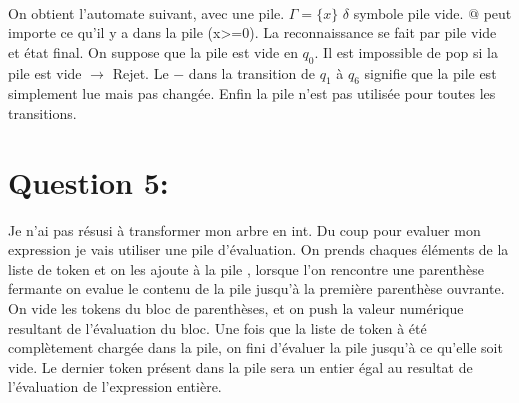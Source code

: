 \documentclass[a4paper]{article}
\begin{document}
\paragraph{}
On obtient l'automate suivant, avec une pile. \newline
$\Gamma={\{x\}}$\newline
$\delta$ symbole pile vide.\newline
$@$ peut importe ce qu'il y a dans la pile (x>=0).\newline
La reconnaissance se fait par pile vide et état final.\newline
On suppose que la pile est vide en $q_0$.\newline
Il est impossible de pop si la pile est vide $\rightarrow$ Rejet.\newline
Le $-$ dans la transition de $q_1$ à $q_6$ signifie que la pile est simplement lue mais pas changée.\newline
Enfin la pile n'est pas utilisée pour toutes les transitions.\newline
\hfill \break
{}
\section*{Question 5:}
Je n'ai pas résusi à transformer mon arbre en int.\newline
Du coup pour evaluer mon expression je vais utiliser une pile d'évaluation. \newline
On prends chaques éléments de la liste de token et on les ajoute à la pile , lorsque l'on rencontre une parenthèse fermante on evalue le contenu de la pile jusqu'à la première parenthèse ouvrante. On vide les tokens du bloc de parenthèses, et on push la valeur numérique resultant de l'évaluation du bloc.
Une fois que la liste de token à été complètement chargée dans la pile, on fini d'évaluer la pile jusqu'à ce qu'elle soit vide. Le dernier token présent dans la pile sera un entier égal au resultat de l'évaluation de l'expression entière.
\end{document}
